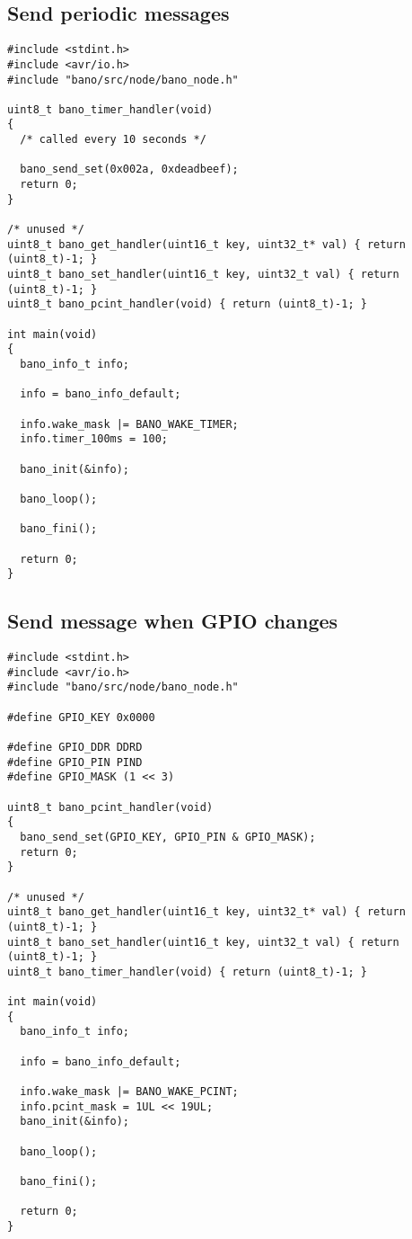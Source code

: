 \documentclass[a4paper, 11pt]{article}
\begin{document}
\clearpage
\subsection{Send periodic messages}
\begin{tiny}
\begin{verbatim}
#include <stdint.h>
#include <avr/io.h>
#include "bano/src/node/bano_node.h"

uint8_t bano_timer_handler(void)
{
  /* called every 10 seconds */

  bano_send_set(0x002a, 0xdeadbeef);
  return 0;
}

/* unused */
uint8_t bano_get_handler(uint16_t key, uint32_t* val) { return (uint8_t)-1; }
uint8_t bano_set_handler(uint16_t key, uint32_t val) { return (uint8_t)-1; }
uint8_t bano_pcint_handler(void) { return (uint8_t)-1; }

int main(void)
{
  bano_info_t info;

  info = bano_info_default;

  info.wake_mask |= BANO_WAKE_TIMER;
  info.timer_100ms = 100;

  bano_init(&info);

  bano_loop();

  bano_fini();

  return 0;
}
\end{verbatim}
\end{tiny}


\clearpage
\subsection{Send message when GPIO changes}
\begin{tiny}
\begin{verbatim}
#include <stdint.h>
#include <avr/io.h>
#include "bano/src/node/bano_node.h"

#define GPIO_KEY 0x0000

#define GPIO_DDR DDRD
#define GPIO_PIN PIND
#define GPIO_MASK (1 << 3)

uint8_t bano_pcint_handler(void)
{
  bano_send_set(GPIO_KEY, GPIO_PIN & GPIO_MASK);
  return 0;
}

/* unused */
uint8_t bano_get_handler(uint16_t key, uint32_t* val) { return (uint8_t)-1; }
uint8_t bano_set_handler(uint16_t key, uint32_t val) { return (uint8_t)-1; }
uint8_t bano_timer_handler(void) { return (uint8_t)-1; }

int main(void)
{
  bano_info_t info;

  info = bano_info_default;

  info.wake_mask |= BANO_WAKE_PCINT;
  info.pcint_mask = 1UL << 19UL;
  bano_init(&info);

  bano_loop();

  bano_fini();

  return 0;
}
\end{verbatim}
\end{tiny}
\end{document}
